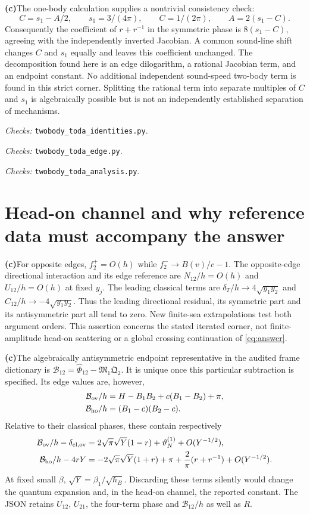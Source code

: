 \documentclass[11pt,a4paper]{article}
\newcommand{\C}{\textbf{(c)}\nobreakspace}
\newcommand{\file}[1]{\nolinkurl{#1}}
\newcommand{\checks}[1]{\par\noindent\textit{Checks:} \file{twobody_toda_#1.py}.\par}
\begin{document}
\C The one-body calculation supplies a nontrivial consistency check:
\begin{equation}
 C=s_1-A/2,\qquad s_1=3/(4\pi),\qquad
 C=1/(2\pi),\qquad A=2(s_1-C).
\end{equation}
Consequently the coefficient of $r+r^{-1}$ in the symmetric phase is
$8(s_1-C)$, agreeing with the independently inverted Jacobian. A common
sound-line shift changes $C$ and $s_1$ equally and leaves this coefficient
unchanged. The decomposition found here is an edge dilogarithm, a rational
Jacobian term, and an endpoint constant. No additional independent
sound-speed two-body term is found in this strict corner. Splitting the
rational term into separate multiples of $C$ and $s_1$ is algebraically
possible but is not an independently established separation of mechanisms.
\checks{identities}\checks{edge}\checks{analysis}

\section{Head-on channel and why reference data must accompany the answer}
\C For opposite edges, $f_2^+=O(h)$ while $f_2^-\to B(v)/c-1$.
The opposite-edge directional interaction and its edge reference are
$N_{12}/h=O(h)$ and $U_{12}/h=O(h)$ at fixed $y_j$.
The leading classical terms are $\delta_T/h\to4\sqrt{y_1y_2}$ and
$C_{12}/h\to-4\sqrt{y_1y_2}$. Thus the leading directional residual,
its symmetric part and its antisymmetric part all tend to zero.
New finite-sea extrapolations test both argument orders. This assertion
concerns the stated iterated corner, not finite-amplitude head-on scattering
or a global crossing continuation of \eqref{eq:answer}.

\C The algebraically antisymmetric endpoint representative in the audited
frame dictionary is
$\mathcal B_{12}=\widehat\Phi_{12}-\mathfrak M_1\mathfrak Q_2$.
It is unique once this particular subtraction is specified. Its edge values
are, however,
\begin{align}
 \mathcal B_{\rm ov}/h
 &=H-B_1B_2+c(B_1-B_2)+\pi,\\
 \mathcal B_{\rm ho}/h&=(B_1-c)(B_2-c).
 \label{eq:Bchannels}
\end{align}
Relative to their classical phases, these contain respectively
\begin{align}
 \mathcal B_{\rm ov}/h-\delta_{{\rm cl},\rm ov}
 &=2\sqrt\pi\sqrt Y(1-r)+\vartheta_N^{(1)}+O(Y^{-1/2}),\\
 \mathcal B_{\rm ho}/h-4rY
 &=-2\sqrt\pi\sqrt Y(1+r)+\pi+\frac2\pi(r+r^{-1})+O(Y^{-1/2}).
 \label{eq:Btails}
\end{align}
At fixed small $\beta$, $\sqrt Y=\beta_1/\sqrt{\hbar_B}$.
Discarding these terms silently would change the quantum expansion and, in
the head-on channel, the reported constant. The JSON retains $U_{12}$,
$U_{21}$, the four-term phase and $\mathcal B_{12}/h$ as well as $R$.
\end{document}
